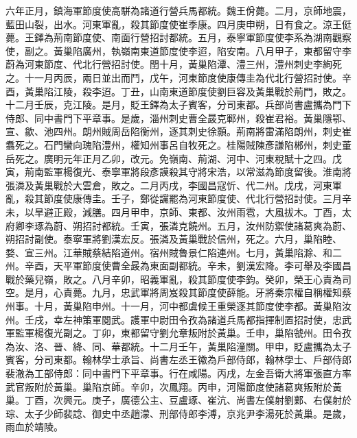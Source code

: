 \begin{pinyinscope}
 六年正月，鎮海軍節度使高駢為諸道行營兵馬都統。魏王佾薨。二月，京師地震，藍田山裂，出水。河東軍亂，殺其節度使崔季康。四月庚申朔，日有食之。涼王侹薨。王鐸為荊南節度使、南面行營招討都統。五月，泰寧軍節度使李系為湖南觀察使，副之。黃巢陷廣州，執嶺南東道節度使李迢，陷安南。八月甲子，東都留守李蔚為河東節度、代北行營招討使。閏十月，黃巢陷潭、澧三州，澧州刺史李絢死之。十一月丙辰，兩日並出而鬥，戊午，河東節度使康傳圭為代北行營招討使。辛酉，黃巢陷江陵，殺李迢。丁丑，山南東道節度使劉巨容及黃巢戰於荊門，敗之。十二月壬辰，克江陵。是月，貶王鐸為太子賓客，分司東都。兵部尚書盧攜為門下侍郎、同中書門下平章事。是歲，淄州刺史曹全晸克鄆州，殺崔君裕。黃巢隱鄂、宣、歙、池四州。朗州賊周岳陷衡州，逐其刺史徐顥。荊南將雷滿陷朗州，刺史崔翥死之。石門蠻向瑰陷澧州，權知州事呂自牧死之。桂陽賊陳彥謙陷郴州，刺史董岳死之。廣明元年正月乙卯，改元。免嶺南、荊湖、河中、河東稅賦十之四。戊寅，荊南監軍楊復光、泰寧軍將段彥謨殺其守將宋浩，以常滋為節度留後。淮南將張潾及黃巢戰於大雲倉，敗之。二月丙戌，李國昌寇忻、代二州。戊戌，河東軍亂，殺其節度使康傳圭。壬子，鄭從讜罷為河東節度使、代北行營招討使。三月辛未，以旱避正殿，減膳。四月甲申，京師、東都、汝州雨雹，大風拔木。丁酉，太府卿李琢為蔚、朔招討都統。壬寅，張潾克饒州。五月，汝州防禦使諸葛爽為蔚、朔招討副使。泰寧軍將劉漢宏反。張潾及黃巢戰於信州，死之。六月，巢陷睦、婺、宣三州。江華賊蔡結陷道州。宿州賊魯景仁陷連州。七月，黃巢陷滁、和二州。辛酉，天平軍節度使曹全晸為東面副都統。辛未，劉漢宏降。李可舉及李國昌戰於藥兒嶺，敗之。八月辛卯，昭義軍亂，殺其節度使李鈞。癸卯，榮王心責為司空。是月，心責薨。九月，忠武軍將周岌殺其節度使薛能。牙將秦宗權自稱權知蔡州事。十月，黃巢陷申州。十一月，河中都虞候王重榮逐其節度使李都。黃巢陷汝州。壬戌，幸左神策軍閱武。護軍中尉田令孜為諸道兵馬都指揮制置招討使，忠武軍監軍楊復光副之。丁卯，東都留守劉允章叛附於黃巢。壬申，巢陷虢州。田令孜為汝、洛、晉、絳、同、華都統。十二月壬午，黃巢陷潼關。甲申，貶盧攜為太子賓客，分司東都。翰林學士承旨、尚書左丞王徽為戶部侍郎，翰林學士、戶部侍郎裴澈為工部侍郎：同中書門下平章事。行在咸陽。丙戌，左金吾衛大將軍張直方率武官叛附於黃巢。巢陷京師。辛卯，次鳳翔。丙申，河陽節度使諸葛爽叛附於黃巢。丁酉，次興元。庚子，廣德公主、豆盧琢、崔沆、尚書左僕射劉鄴、右僕射於琮、太子少師裴諗、御史中丞趙濛、刑部侍郎李溥，京兆尹李湯死於黃巢。是歲，雨血於靖陵。




\end{pinyinscope}
